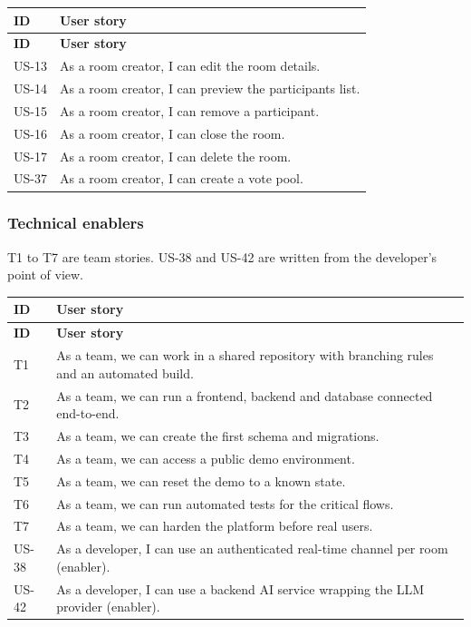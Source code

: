 \documentclass[12pt,a4paper]{report}
\begin{document}
\begin{longtable}{@{}p{}p{}@{}}
\toprule
\textbf{ID} & \textbf{User story} \\
\midrule
\endfirsthead
\toprule
\textbf{ID} & \textbf{User story} \\
\midrule
\endhead
\bottomrule
\endfoot
US-13 & As a room creator, I can edit the room details. \\
US-14 & As a room creator, I can preview the participants list. \\
US-15 & As a room creator, I can remove a participant. \\
US-16 & As a room creator, I can close the room. \\
US-17 & As a room creator, I can delete the room. \\
US-37 & As a room creator, I can create a vote pool. \\
\end{longtable}

\subsubsection*{Technical enablers}

T1 to T7 are team stories. US-38 and US-42 are written from the developer's point of view.

\begin{longtable}{@{}p{}p{}@{}}
\toprule
\textbf{ID} & \textbf{User story} \\
\midrule
\endfirsthead
\toprule
\textbf{ID} & \textbf{User story} \\
\midrule
\endhead
\bottomrule
\endfoot
T1 & As a team, we can work in a shared repository with branching rules and an automated build. \\
T2 & As a team, we can run a frontend, backend and database connected end-to-end. \\
T3 & As a team, we can create the first schema and migrations. \\
T4 & As a team, we can access a public demo environment. \\
T5 & As a team, we can reset the demo to a known state. \\
T6 & As a team, we can run automated tests for the critical flows. \\
T7 & As a team, we can harden the platform before real users. \\
US-38 & As a developer, I can use an authenticated real-time channel per room (enabler). \\
US-42 & As a developer, I can use a backend AI service wrapping the LLM provider (enabler). \\
\end{longtable}
\end{document}

